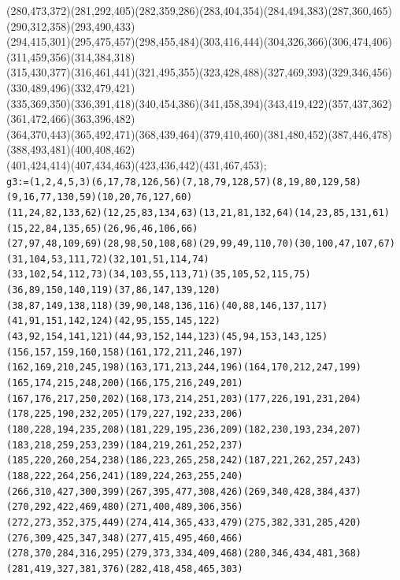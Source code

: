 \documentclass[a4paper,twopage,reqno,12pt]{amsart}
\theoremstyle{definition}
\numberwithin{equation}{section}
\begin{document}
\begin{enumerate}
{{(280,473,372)(281,292,405)(282,359,286)(283,404,354)(284,494,383)(287,360,465)(290,312,358)(293,490,433)\\
(294,415,301)(295,475,457)(298,455,484)(303,416,444)(304,326,366)(306,474,406)(311,459,356)(314,384,318)\\
(315,430,377)(316,461,441)(321,495,355)(323,428,488)(327,469,393)(329,346,456)(330,489,496)(332,479,421)\\
(335,369,350)(336,391,418)(340,454,386)(341,458,394)(343,419,422)(357,437,362)(361,472,466)(363,396,482)\\
(364,370,443)(365,492,471)(368,439,464)(379,410,460)(381,480,452)(387,446,478)(388,493,481)(400,408,462)\\
(401,424,414)(407,434,463)(423,436,442)(431,467,453);}\\
\texttt{g3:=(1,2,4,5,3)(6,17,78,126,56)(7,18,79,128,57)(8,19,80,129,58)(9,16,77,130,59)(10,20,76,127,60)\\
(11,24,82,133,62)(12,25,83,134,63)(13,21,81,132,64)(14,23,85,131,61)(15,22,84,135,65)(26,96,46,106,66)\\
(27,97,48,109,69)(28,98,50,108,68)(29,99,49,110,70)(30,100,47,107,67)(31,104,53,111,72)(32,101,51,114,74)\\
(33,102,54,112,73)(34,103,55,113,71)(35,105,52,115,75)(36,89,150,140,119)(37,86,147,139,120)\\
(38,87,149,138,118)(39,90,148,136,116)(40,88,146,137,117)(41,91,151,142,124)(42,95,155,145,122)\\
(43,92,154,141,121)(44,93,152,144,123)(45,94,153,143,125)(156,157,159,160,158)(161,172,211,246,197)\\
(162,169,210,245,198)(163,171,213,244,196)(164,170,212,247,199)(165,174,215,248,200)(166,175,216,249,201)\\
(167,176,217,250,202)(168,173,214,251,203)(177,226,191,231,204)(178,225,190,232,205)(179,227,192,233,206)\\
(180,228,194,235,208)(181,229,195,236,209)(182,230,193,234,207)(183,218,259,253,239)(184,219,261,252,237)\\
(185,220,260,254,238)(186,223,265,258,242)(187,221,262,257,243)(188,222,264,256,241)(189,224,263,255,240)\\
(266,310,427,300,399)(267,395,477,308,426)(269,340,428,384,437)(270,292,422,469,480)(271,400,489,306,356)\\
(272,273,352,375,449)(274,414,365,433,479)(275,382,331,285,420)(276,309,425,347,348)(277,415,495,460,466)\\
(278,370,284,316,295)(279,373,334,409,468)(280,346,434,481,368)(281,419,327,381,376)(282,418,458,465,303)\\
}}
\end{enumerate}
\end{document}
